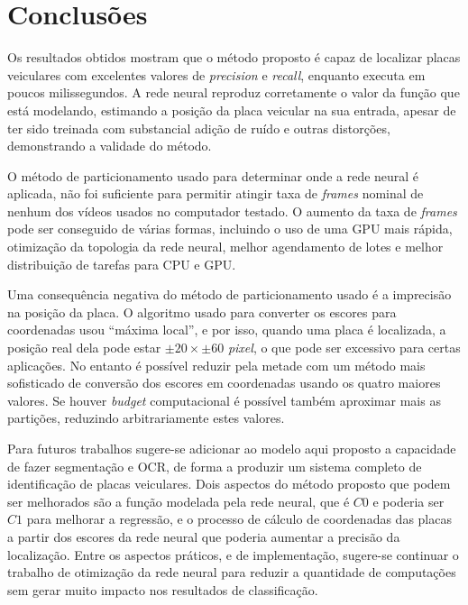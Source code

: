 
\chapter{Conclusões}

Os resultados obtidos mostram que o método proposto é capaz de localizar placas
veiculares com excelentes valores de \emph{precision} e \emph{recall}, enquanto
executa em poucos milissegundos.  
A rede neural reproduz corretamente o valor da função
que está modelando, estimando a posição da placa veicular na sua
entrada, apesar de ter sido treinada com substancial adição de ruído e outras
distorções, demonstrando a validade do método.

O método de particionamento usado para determinar onde a rede neural é
aplicada, não foi suficiente para permitir atingir taxa de \emph{frames}
nominal de nenhum dos vídeos usados no computador testado. O aumento da
taxa de \emph{frames}
pode ser conseguido de várias formas, incluindo o uso de uma GPU mais rápida,
otimização da topologia da rede neural, melhor agendamento de lotes e melhor
distribuição de tarefas para CPU e GPU.

Uma consequência negativa do método de particionamento usado
é a imprecisão na
posição da placa. O algoritmo usado para converter os escores para coordenadas
usou ``máxima local'', e por isso, quando uma placa é localizada, a posição real
dela pode estar $\pm 20 \times \pm 60$ \emph{pixel}, o que pode ser excessivo
para
certas aplicações. No entanto é possível reduzir pela metade com um método mais
sofisticado de conversão dos escores em coordenadas usando os quatro maiores
valores. Se houver \emph{budget} computacional é possível também
aproximar mais as partições, reduzindo arbitrariamente estes valores.

Para futuros trabalhos sugere-se adicionar ao modelo aqui proposto a
capacidade de fazer segmentação e OCR, de forma a produzir um sistema completo
de identificação de placas veiculares. Dois aspectos do método proposto que
podem ser melhorados são a função modelada pela rede neural, que é $C0$ e
poderia ser $C1$ para melhorar a regressão, e o processo de cálculo de
coordenadas das placas a partir dos escores da rede neural que poderia
aumentar a precisão da localização.  Entre os aspectos práticos, e de
implementação, sugere-se continuar o trabalho de otimização da rede
neural para reduzir a quantidade de computações sem gerar muito impacto nos
resultados de classificação.

